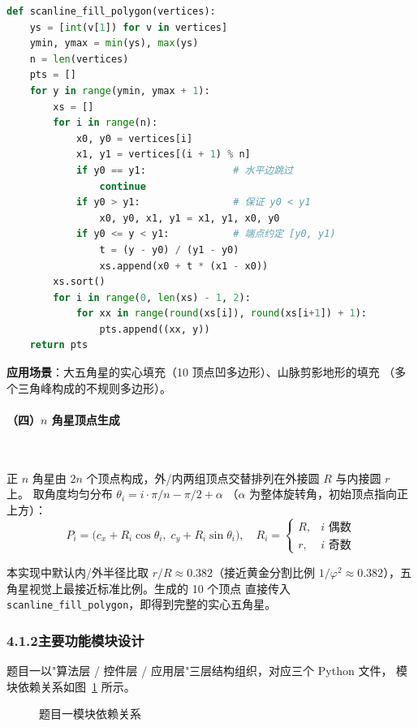 \documentclass[12pt, a4paper]{article}
\begin{document}
\begin{lstlisting}[language=Python, caption={扫描线多边形填充（algorithms.py 摘录）}, label=lst:scanline]
def scanline_fill_polygon(vertices):
    ys = [int(v[1]) for v in vertices]
    ymin, ymax = min(ys), max(ys)
    n = len(vertices)
    pts = []
    for y in range(ymin, ymax + 1):
        xs = []
        for i in range(n):
            x0, y0 = vertices[i]
            x1, y1 = vertices[(i + 1) % n]
            if y0 == y1:               # 水平边跳过
                continue
            if y0 > y1:                # 保证 y0 < y1
                x0, y0, x1, y1 = x1, y1, x0, y0
            if y0 <= y < y1:           # 端点约定 [y0, y1)
                t = (y - y0) / (y1 - y0)
                xs.append(x0 + t * (x1 - x0))
        xs.sort()
        for i in range(0, len(xs) - 1, 2):
            for xx in range(round(xs[i]), round(xs[i+1]) + 1):
                pts.append((xx, y))
    return pts
\end{lstlisting}

\textbf{应用场景}：大五角星的实心填充（10 顶点凹多边形）、山脉剪影地形的填充
（多个三角峰构成的不规则多边形）。

\paragraph{（四）$n$ 角星顶点生成}~

正 $n$ 角星由 $2n$ 个顶点构成，外/内两组顶点交替排列在外接圆 $R$ 与内接圆 $r$ 上。
取角度均匀分布 $\theta_i = i \cdot \pi / n - \pi/2 + \alpha$
（$\alpha$ 为整体旋转角，初始顶点指向正上方）：
\[
P_i = \big(c_x + R_i \cos\theta_i,\; c_y + R_i \sin\theta_i\big),\quad
R_i = \begin{cases} R, & i \text{ 偶数} \\ r, & i \text{ 奇数} \end{cases}
\]

本实现中默认内/外半径比取 $r/R \approx 0.382$（接近黄金分割比例
$1/\varphi^2 \approx 0.382$），五角星视觉上最接近标准比例。生成的 10 个顶点
直接传入 \texttt{scanline\_fill\_polygon}，即得到完整的实心五角星。

\subsubsection*{4.1.2\quad 主要功能模块设计}

题目一以"算法层 / 控件层 / 应用层"三层结构组织，对应三个 Python 文件，
模块依赖关系如图~\ref{fig:module} 所示。

\begin{figure}[H]
\centering
{}
\caption{题目一模块依赖关系}
\label{fig:module}
\end{figure}
\end{document}
